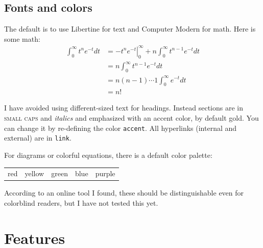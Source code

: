 \documentclass{sl2ams}
\begin{document}
\subsection{Fonts and colors}
The default is to use Libertine for text and Computer Modern for math.
Here is some math:
\begin{align*}
  \int_{0}^{\infty} t^{n} e^{-t} dt
  &=
  \left.- t^{n} e^{-t} \right|_{0}^{\infty}
  +
  n \int_{0}^{\infty} t^{n-1} e^{-t} dt
  \\
  &=
  n \int_{0}^{\infty} t^{n-1} e^{-t} dt
  \\
  &= n(n-1) \cdots 1 \int_{0}^{\infty} e^{-t} dt
  \\
  &= n!
\end{align*}

I have avoided using different-sized text for headings.
Instead sections are in {\scshape small caps} and {\itshape italics} and emphasized with an {\color{accent} accent} color, by default gold.
You can change it by re-defining the color {\color{accent} \texttt{accent}}.
All hyperlinks (internal and external) are in {\color{link} \texttt{link}}.%

For diagrams or colorful equations, there is a default color palette:
\begin{center}
  \begin{tabular}{ccccc}
    {\color{slred} red} 
    &
    {\color{slyellow} yellow}
    &
    {\color{slgreen} green}
    &
    {\color{slblue} blue} 
    &
    {\color{slpurple} purple} 
  \end{tabular}
\end{center}
According to an online tool I found, these should be distinguishable even for colorblind readers, but I have not tested this yet.

\section{Features}
\end{document}
